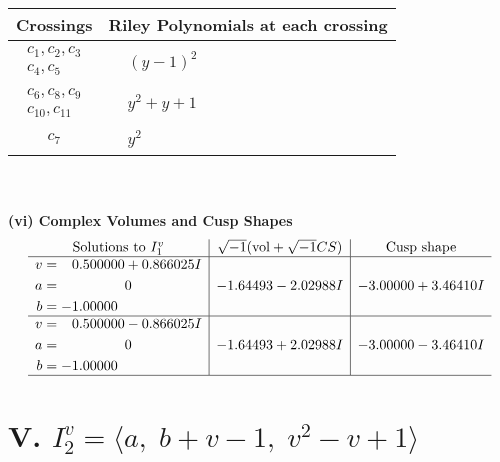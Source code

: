 \documentclass[1p]{elsarticle_modified}
\theoremstyle{definition}
\newcommand{\I}{\sqrt{-1}}
\begin{document}
\begin{tabular}{m{50pt}|m{274pt}}
Crossings & \hspace{64pt}Riley Polynomials at each crossing \\
\hline $$\begin{aligned}c_{1},c_{2},c_{3}\\c_{4},c_{5}\end{aligned}$$&$\begin{aligned}
&(y-1)^2
\end{aligned}$\\
\hline $$\begin{aligned}c_{6},c_{8},c_{9}\\c_{10},c_{11}\end{aligned}$$&$\begin{aligned}
&y^2+y+1
\end{aligned}$\\
\hline $$\begin{aligned}c_{7}\end{aligned}$$&$\begin{aligned}
&y^2
\end{aligned}$\\
\hline
\end{tabular}\\~\\
\newpage\flushleft \textbf{(vi) Complex Volumes and Cusp Shapes}
$$\begin{array}{c|c|c}  
\text{Solutions to }I^v_{1}& \I (\text{vol} + \sqrt{-1}CS) & \text{Cusp shape}\\
 \hline 
\begin{aligned}
v &= \phantom{-}0.500000 + 0.866025 I \\
a &= \phantom{-0.000000 } 0 \\
b &= -1.00000\phantom{ +0.000000I}\end{aligned}
 & -1.64493 - 2.02988 I & -3.00000 + 3.46410 I \\ \hline\begin{aligned}
v &= \phantom{-}0.500000 - 0.866025 I \\
a &= \phantom{-0.000000 } 0 \\
b &= -1.00000\phantom{ +0.000000I}\end{aligned}
 & -1.64493 + 2.02988 I & -3.00000 - 3.46410 I\\
 \hline 
 \end{array}$$\newpage\newpage\renewcommand{\arraystretch}{1}
\centering \section*{V. $I^v_{2}= \langle a,\;b+v-1,\;v^2- v+1 \rangle$}
\end{document}
